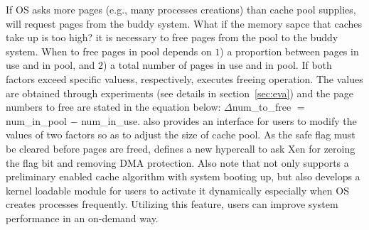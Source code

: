 If OS asks more pages (e.g., many processes creations) than cache pool supplies, \name will request pages from the buddy system. What if the memory sapce that caches take up is too high? it is necessary to free pages from the pool to the buddy system. When to free pages in pool depends on $1$) a proportion between pages in use and in pool, and $2$) a total number of pages in use and in pool. If both factors exceed specific valuess, respectively, \name executes freeing operation. The values are obtained through experiments (see details in section~\ref{sec:eva}) and the page numbers to free are stated in the equation below: $\Delta$num\_to\_free $=$ num\_in\_pool $-$ num\_in\_use. \name also provides an interface for users to modify the values of two factors so as to adjust the size of cache pool. As the safe flag must be cleared before pages are freed, \name defines a new hypercall to ask Xen for zeroing the flag bit and removing DMA protection. Also note that \name not only supports a preliminary enabled cache algorithm with system booting up, but also develops a kernel loadable module for users to activate it dynamically especially when OS creates processes frequently. Utilizing this feature, users can improve system performance in an on-demand way.  

